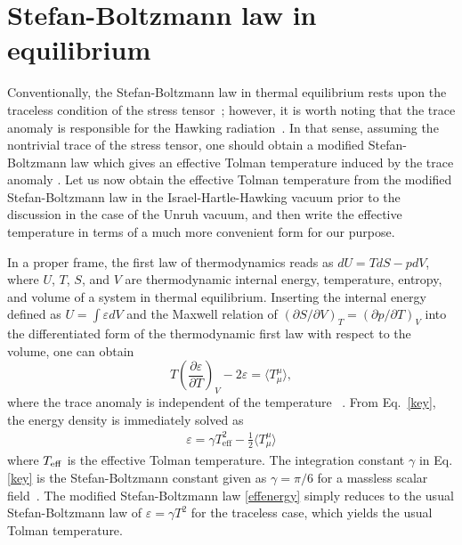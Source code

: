 \documentclass[aps,preprint,a4paper,showpacs,showkeys,superscriptaddress]{revtex4-1}
\begin{document}
\section{Stefan-Boltzmann law in equilibrium}
\label{sec:Stefan-Boltzmann law in equilibrium}

Conventionally, the Stefan-Boltzmann law in thermal equilibrium rests upon
the traceless condition of the stress tensor~\cite{Tolman:1930zza};
however, it is worth noting that the trace anomaly is responsible for the
Hawking radiation~\cite{Christensen:1977jc}.
In that sense, assuming the nontrivial trace of the stress tensor,
one should obtain a modified Stefan-Boltzmann law which gives an effective Tolman temperature
induced by the trace anomaly \cite{Gim:2015era}.
Let us now obtain the effective Tolman temperature from the modified Stefan-Boltzmann law
in the Israel-Hartle-Hawking vacuum prior to the discussion in the case of the Unruh vacuum,
and then write
the effective temperature in terms of a much more convenient form for our purpose.

In a proper frame, the first law of thermodynamics reads as $dU =TdS-pdV$,
where $U$, $T$, $S$, and $V$ are thermodynamic internal energy,
temperature, entropy, and volume of a system in thermal equilibrium.
Inserting the internal energy defined as $U=\int \varepsilon dV$
and the Maxwell relation of
$(\partial S/\partial V )_T = (\partial p/\partial T)_V$
into the differentiated form of the thermodynamic first law with respect to the volume,
one can obtain
\begin{equation}
\label{key}
T \left(\frac{\partial \varepsilon}{\partial T}\right)_V-2\varepsilon = \langle T^\mu_\mu \rangle,
\end{equation}
where the trace anomaly is independent of the temperature
~\cite{BoschiFilho:1991xz}.
From Eq.~\eqref{key}, the energy density is immediately solved as
\begin{align}
 \varepsilon= \gamma T^2_\text{eff} -\frac{1}{2} \langle T^\mu_\mu \rangle  \label{effenergy}
\end{align}
where $T_{\rm eff}$ is the effective Tolman temperature.
The integration constant $\gamma$ in Eq. \eqref{key}
is the Stefan-Boltzmann constant given as $\gamma = \pi/6$
for a massless scalar field~\cite{Christensen:1977jc}.
The modified Stefan-Boltzmann law \eqref{effenergy}
simply reduces to the usual Stefan-Boltzmann law of $\varepsilon=\gamma T^2$
for the traceless case, which yields the usual Tolman temperature.
\end{document}
